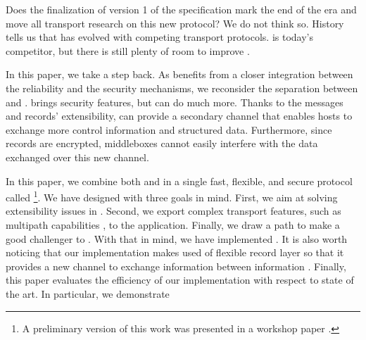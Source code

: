 Does the finalization of version 1 of the \quic specification mark the
end of the \tcp era and move all transport research on this new protocol?
We do not think so. History tells us that \tcp has evolved with competing
transport protocols. \quic is today's competitor, but there is still plenty of
room to improve \tcp.

In this paper, we take a step back. As \quic benefits from a closer integration between the reliability and the security mechanisms, we reconsider the separation between \tcp and \tls.
\tls brings security features, but  can do much more. Thanks to the  messages and records' extensibility, \tls can provide a secondary channel that enables hosts to exchange more control information and structured data. Furthermore, since \tls records are encrypted, middleboxes cannot easily interfere with the data exchanged over this new channel.


In this paper, we combine both \tcp and \tls in a single fast, flexible, and secure protocol called \textbf{\tcpls}\footnote{A preliminary version of this work was presented in a workshop paper \cite{rochet2020tcpls}.}.  We have designed \tcpls with three goals in mind.  First, we aim at solving extensibility issues in \tcp {}. Second, we export complex transport features, such as multipath capabilities , to the application.  Finally, we draw a path to make \tcpls a good challenger to \quic. With that in mind, we have implemented \tcpls {}.  It is also worth noticing that our implementation makes used of \tls flexible record layer so that it provides a new channel to exchange information between \tcpls information .  Finally, this paper evaluates the efficiency of our \tcpls implementation with respect to state of the art.  In particular, we demonstrate 



